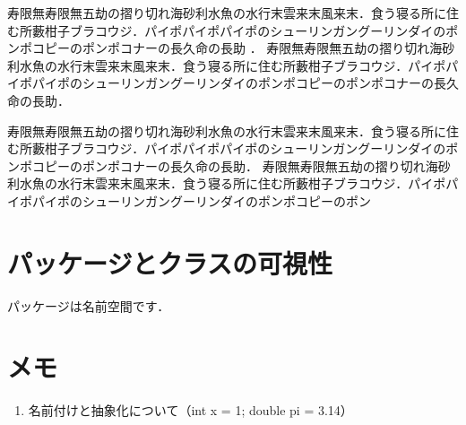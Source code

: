 \documentclass[a4j,papersize]{jsbook}
\begin{document}
寿限無寿限無五劫の摺り切れ海砂利水魚の水行末雲来末風来末．食う寝る所に住む所藪柑子ブラコウジ．パイポパイポパイポのシューリンガングーリンダイのポンポコピーのポンポコナーの長久命の長助
．
寿限無寿限無五劫の摺り切れ海砂利水魚の水行末雲来末風来末．食う寝る所に住む所藪柑子ブラコウジ．パイポパイポパイポのシューリンガングーリンダイのポンポコピーのポンポコナーの長久命の長助．

寿限無寿限無五劫の摺り切れ海砂利水魚の水行末雲来末風来末．食う寝る所に住む所藪柑子ブラコウジ．パイポパイポパイポのシューリンガングーリンダイのポンポコピーのポンポコナーの長久命の長助．
寿限無寿限無五劫の摺り切れ海砂利水魚の水行末雲来末風来末．食う寝る所に住む所藪柑子ブラコウジ．パイポパイポパイポのシューリンガングーリンダイのポンポコピーのポン

\section{パッケージとクラスの可視性}
パッケージは名前空間です．

\section{メモ}
\begin{enumerate}
 \item 名前付けと抽象化について（int x = 1; double pi = 3.14）
\end{enumerate}
\end{document}
